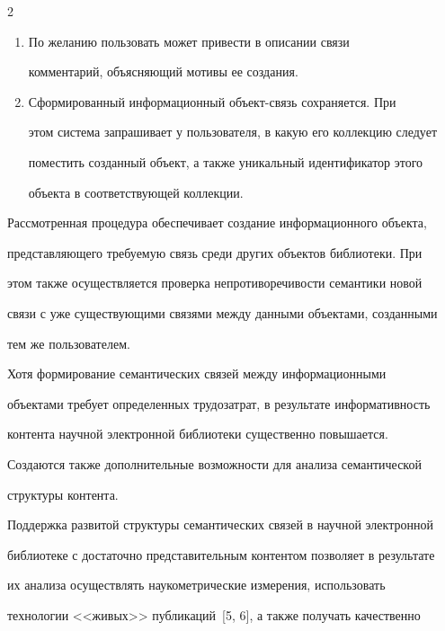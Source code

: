 \begin{multicols}{2}
\begin{enumerate}[1.]
администратором системы или соответствующего словаря. 


  \item По желанию пользовать может привести в описании связи 


комментарий, объясняющий мотивы ее создания.


  \item Сформированный информационный объект-связь сохраняется. При 


этом система запрашивает у пользователя, в какую его коллекцию следует 


поместить созданный объект, а также уникальный идентификатор этого 


объекта в соответствующей коллекции. 


  \end{enumerate}


  


  Рассмотренная процедура обеспечивает создание информационного объекта, 


представляющего требуемую связь среди других объектов библиотеки. При 


этом также осуществляется проверка непротиворечивости семантики новой 


связи с уже существующими связями между данными объектами, созданными 


тем же пользователем. 


  


  Хотя формирование семантических связей между информационными 


объектами требует определенных трудозатрат, в результате информативность 


контента научной электронной библиотеки существенно повышается. 


Создаются также дополнительные возможности для анализа семантической 


структуры контента. 


  


  Поддержка развитой структуры семантических связей в научной электронной 


библиотеке с достаточно представительным контентом позволяет в результате 


их анализа осуществлять наукометрические измерения, использовать 


технологии <<живых>> публикаций~[5, 6], а также получать качественно 



\end{multicols}
